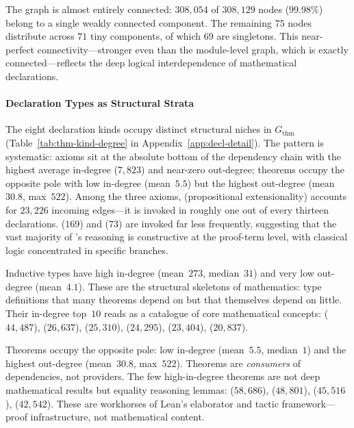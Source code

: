 The graph is almost entirely connected: $308{,}054$ of $308{,}129$ nodes ($99.98\%$) belong to a single weakly connected component. The remaining $75$ nodes distribute across $71$ tiny components, of which $69$ are singletons. This near-perfect connectivity---stronger even than the module-level graph, which is exactly connected---reflects the deep logical interdependence of mathematical declarations.

\paragraph{Declaration Types as Structural Strata}
\label{sec:thm-types}

The eight declaration kinds occupy distinct structural niches in $G_{\mathrm{thm}}$ (Table~\ref{tab:thm-kind-degree} in Appendix~\ref{app:decl-detail}). The pattern is systematic: axioms sit at the absolute bottom of the dependency chain with the highest average in-degree ($7{,}823$) and near-zero out-degree; theorems occupy the opposite pole with low in-degree (mean~$5.5$) but the highest out-degree (mean~$30.8$, max~$522$). Among the three axioms,  (propositional extensionality) accounts for $23{,}226$ incoming edges---it is invoked in roughly one out of every thirteen declarations.  ($169$) and  ($73$) are invoked far less frequently, suggesting that the vast majority of 's reasoning is constructive at the proof-term level, with classical logic concentrated in specific branches.

Inductive types have high in-degree (mean~$273$, median~$31$) and very low out-degree (mean~$4.1$). These are the structural skeletons of mathematics: type definitions that many theorems depend on but that themselves depend on little. Their in-degree top~$10$ reads as a catalogue of core mathematical concepts:  ($44{,}487$),  ($26{,}637$),  ($25{,}310$),  ($24{,}295$),  ($23{,}404$),  ($20{,}837$).

Theorems occupy the opposite pole: low in-degree (mean~$5.5$, median~$1$) and the highest out-degree (mean~$30.8$, max~$522$). Theorems are \emph{consumers} of dependencies, not providers. The few high-in-degree theorems are not deep mathematical results but equality reasoning lemmas:  ($58{,}686$),  ($48{,}801$),  ($45{,}516$),  ($42{,}542$). These are workhorses of Lean's elaborator and tactic framework---proof infrastructure, not mathematical content.

